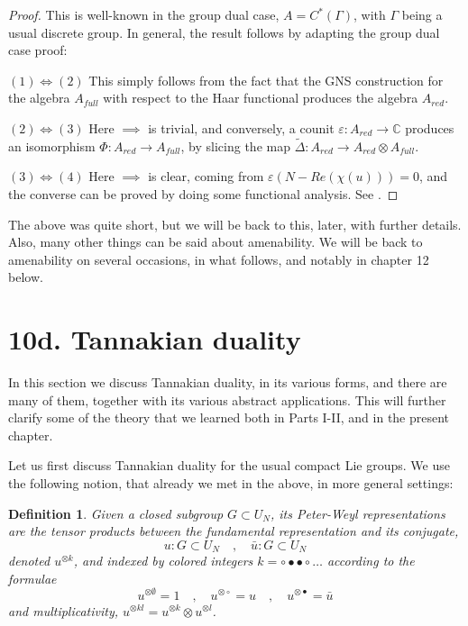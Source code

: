 \documentclass[12pt]{amsbook}
\newtheorem{definition}[theorem]{Definition}
\begin{document}
\begin{proof}
This is well-known in the group dual case, $A=C^*(\Gamma)$, with $\Gamma$ being a usual discrete group. In general, the result follows by adapting the group dual case proof:

\medskip

$(1)\iff(2)$ This simply follows from the fact that the GNS construction for the algebra $A_{full}$ with respect to the Haar functional produces the algebra $A_{red}$.

\medskip

$(2)\iff(3)$ Here $\implies$ is trivial, and conversely, a counit $\varepsilon:A_{red}\to\mathbb C$ produces an isomorphism $\Phi:A_{red}\to A_{full}$, by slicing the map $\widetilde{\Delta}:A_{red}\to A_{red}\otimes A_{full}$.

\medskip

$(3)\iff(4)$ Here $\implies$ is clear, coming from $\varepsilon(N-Re(\chi (u)))=0$, and the converse can be proved by doing some functional analysis. See \cite{wo1}.
\end{proof}

The above was quite short, but we will be back to this, later, with further details. Also, many other things can be said about amenability. We will be back to amenability on several occasions, in what follows, and notably in chapter 12 below.

\section*{10d. Tannakian duality}

In this section we discuss Tannakian duality, in its various forms, and there are many of them, together with its various abstract applications. This will further clarify some of the theory that we learned both in Parts I-II, and in the present chapter. 

\bigskip

Let us first discuss Tannakian duality for the usual compact Lie groups. We use the following notion, that already we met in the above, in more general settings:


\begin{definition}
Given a closed subgroup $G\subset U_N$, its Peter-Weyl representations are the tensor products between the fundamental representation and its conjugate,
$$u:G\subset U_N\quad,\quad \bar{u}:G\subset U_N$$
denoted $u^{\otimes k}$, and indexed by colored integers $k=\circ\bullet\bullet\circ\ldots$ according to the formulae
$$u^{\otimes\emptyset}=1\quad,\quad 
u^{\otimes\circ}=u\quad,\quad 
u^{\otimes\bullet}=\bar{u}$$
and multiplicativity, $u^{\otimes kl}=u^{\otimes k}\otimes u^{\otimes l}$.
\end{definition}
\end{document}
